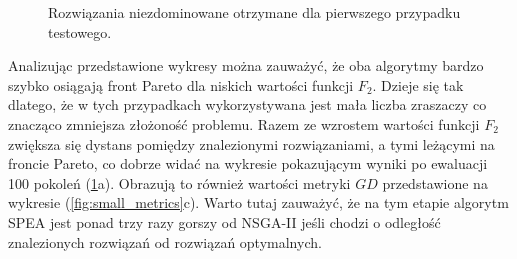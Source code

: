 \documentclass[twoside]{iisthesis}
\begin{document}
\begin{figure}\centering
{}
    \hfill
{}
    \hfill
{}
\caption{Rozwiązania niezdominowane otrzymane dla pierwszego przypadku testowego.}
    \label{fig:small_front}
\end{figure}

Analizując przedstawione wykresy można zauważyć, że oba algorytmy bardzo szybko osiągają front Pareto dla niskich wartości funkcji $F_{2}$. Dzieje się tak dlatego, że w tych przypadkach wykorzystywana jest mała liczba zraszaczy co znacząco zmniejsza złożoność problemu. Razem ze wzrostem wartości funkcji $F_{2}$ zwiększa się dystans pomiędzy znalezionymi rozwiązaniami, a tymi leżącymi na froncie Pareto, co dobrze widać na wykresie pokazującym wyniki po ewaluacji 100 pokoleń (\ref{fig:small_front}a). Obrazują to również wartości metryki $GD$ przedstawione na wykresie (\ref{fig:small_metrics}c). Warto tutaj zauważyć, że na tym etapie algorytm SPEA jest ponad trzy razy gorszy od NSGA-II jeśli chodzi o odległość znalezionych rozwiązań od rozwiązań optymalnych.
\end{document}
